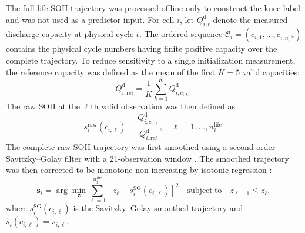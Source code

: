 \documentclass[pdflatex,sn-mathphys-num]{sn-jnl}
\begin{document}
The full-life SOH trajectory was processed offline only to construct the knee label and was not used as a predictor input. For cell $i$, let $Q_{i,t}^{\mathrm{d}}$ denote the measured discharge capacity at physical cycle $t$. The ordered sequence $\mathcal{C}_i=(c_{i,1},\ldots,c_{i,n_i^{\mathrm{life}}})$ contains the physical cycle numbers having finite positive capacity over the complete trajectory. To reduce sensitivity to a single initialization measurement, the reference capacity was defined as the mean of the first $K=5$ valid capacities:
\begin{equation}
Q_{i,\mathrm{ref}}^{\mathrm{d}}=\frac{1}{K}\sum_{k=1}^{K}Q_{i,c_{i,k}}^{\mathrm{d}},
\label{eq:ref_capacity}
\end{equation}
The raw SOH at the $\ell$th valid observation was then defined as
\begin{equation}
s_i^{\mathrm{raw}}(c_{i,\ell})=
\frac{Q_{i,c_{i,\ell}}^{\mathrm{d}}}{Q_{i,\mathrm{ref}}^{\mathrm{d}}},
\quad \ell=1,\ldots,n_i^{\mathrm{life}}.
\label{eq:raw_soh}
\end{equation}
The complete raw SOH trajectory was first smoothed using a second-order Savitzky--Golay filter with a 21-observation window \cite{savitzky1964smoothing}. The smoothed trajectory was then corrected to be monotone non-increasing by isotonic regression  \cite{best1990isotonic}:
\begin{equation}
\widetilde{\mathbf{s}}_i
=\arg\min_{\mathbf{z}}\sum_{\ell=1}^{n_i^{\mathrm{life}}}
\left[z_\ell-s_i^{\mathrm{SG}}(c_{i,\ell})\right]^2
\quad \mathrm{subject\ to}\quad z_{\ell+1}\leq z_\ell,
\end{equation}
where $s_i^{\mathrm{SG}}(c_{i,\ell})$ is the Savitzky--Golay-smoothed trajectory and $\widetilde{s}_i(c_{i,\ell})=\widetilde{s}_{i,\ell}$.

\end{document}
